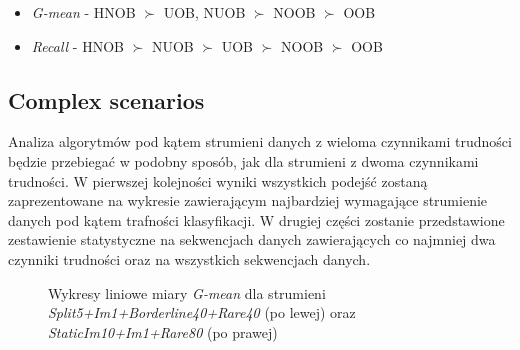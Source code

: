 \begin{itemize}
    \item \textit{G-mean} - HNOB $\succ$ UOB, NUOB $\succ$ NOOB $\succ$ OOB
    \item \textit{Recall} - HNOB $\succ$ NUOB $\succ$ UOB $\succ$ NOOB $\succ$ OOB
\end{itemize}

\subsection{Complex scenarios}
\label{Label:ComplexScenariosHNOB}

\noindent Analiza algorytmów pod kątem strumieni danych z wieloma czynnikami trudności będzie przebiegać w podobny sposób, jak dla strumieni z dwoma czynnikami trudności. W pierwszej kolejności wyniki wszystkich podejść zostaną zaprezentowane na wykresie zawierającym najbardziej wymagające strumienie danych pod kątem trafności klasyfikacji. W drugiej części zostanie przedstawione zestawienie statystyczne na sekwencjach danych zawierających co najmniej dwa czynniki trudności oraz na wszystkich sekwencjach danych.

\newpage

\begin{figure}[h]
    \centering
    \qquad
    \caption{Wykresy liniowe miary \textit{G-mean} dla strumieni \textit{Split5+Im1+Borderline40+Rare40} (po lewej) oraz \textit{StaticIm10+Im1+Rare80} (po prawej)}
\end{figure}


